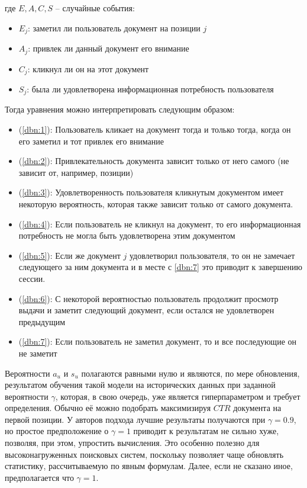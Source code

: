 \documentclass[diploma]{nanolab2015}
\begin{document}
где $E, A, C, S$ -- случайные события:
\begin{itemize}
  \item $E_j$: заметил ли пользователь документ на позиции $j$
  \item $A_j$: привлек ли данный документ его внимание
  \item $C_j$: кликнул ли он на этот документ
  \item $S_j$: была ли удовлетворена информационная потребность пользователя
\end{itemize}
Тогда уравнения можно интерпретировать следующим образом:
\begin{itemize}
  \item (\ref{dbn:1}): Пользователь кликает на документ тогда и только тогда, когда он его заметил и тот привлек его внимание
  \item (\ref{dbn:2}): Привлекательность документа зависит только от него самого (не зависит от, например, позиции)
  \item (\ref{dbn:3}): Удовлетворенность пользователя кликнутым документом имеет некоторую вероятность, которая также зависит только от самого документа.
  \item (\ref{dbn:4}): Если пользователь не кликнул на документ, то его информационная потребность не могла быть удовлетворена этим документом
  \item (\ref{dbn:5}): Если же документ $j$ удовлетворил пользователя, то он не замечает следующего за ним документа и в месте с \ref{dbn:7} это приводит к завершению сессии.
  \item (\ref{dbn:6}): С некоторой вероятностью пользователь продолжит просмотр выдачи и заметит следующий документ, если остался не удовлетворен предыдущим
  \item (\ref{dbn:7}): Если пользователь не заметил документ, то и все последующие он не заметит
\end{itemize}

Вероятности $a_u$ и $s_u$ полагаются равными нулю и являются, по мере обновления, результатом обучения такой модели на исторических данных при заданной вероятности $\gamma$, которая, в свою очередь, уже является гиперпараметром и требует определения. Обычно её можно подобрать максимизируя $CTR$ документа на первой позиции. У авторов подхода лучшие результаты получаются при $\gamma = 0.9$, но простое предположение о $\gamma = 1$ приводит к результатам не сильно хуже, позволяя, при этом, упростить вычисления. Это особенно полезно для высоконагруженных поисковых систем, поскольку позволяет чаще обновлять статистику, рассчитываемую по явным формулам. Далее, если не сказано иное, предполагается что $\gamma = 1$.
\end{document}
